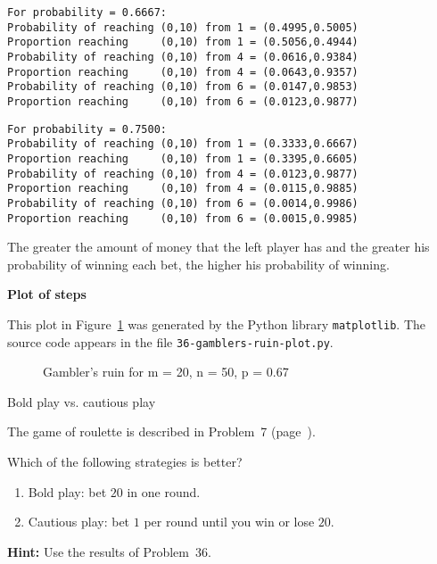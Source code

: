 \newpage

\sml{}
\begin{verbatim}
For probability = 0.6667:
Probability of reaching (0,10) from 1 = (0.4995,0.5005)
Proportion reaching     (0,10) from 1 = (0.5056,0.4944)
Probability of reaching (0,10) from 4 = (0.0616,0.9384)
Proportion reaching     (0,10) from 4 = (0.0643,0.9357)
Probability of reaching (0,10) from 6 = (0.0147,0.9853)
Proportion reaching     (0,10) from 6 = (0.0123,0.9877)
\end{verbatim}

\begin{verbatim}
For probability = 0.7500:
Probability of reaching (0,10) from 1 = (0.3333,0.6667)
Proportion reaching     (0,10) from 1 = (0.3395,0.6605)
Probability of reaching (0,10) from 4 = (0.0123,0.9877)
Proportion reaching     (0,10) from 4 = (0.0115,0.9885)
Probability of reaching (0,10) from 6 = (0.0014,0.9986)
Proportion reaching     (0,10) from 6 = (0.0015,0.9985)
\end{verbatim}
The greater the amount of money that the left player has and the greater his probability of winning each bet, the higher his probability of winning.

\textbf{Plot of steps}

This plot in Figure~\ref{f.plot} was generated by the Python library \texttt{matplotlib}. The source code appears in the file \texttt{36-gamblers-ruin-plot.py}.
\begin{figure}
\begin{center}

\end{center}
\caption{Gambler's ruin for m = 20, n = 50, p = 0.67}\label{f.plot}
\end{figure}


\newpage

\begin{prob}{Bold play vs. cautious play}

The game of roulette is described in Problem~7 (page~\pageref{p.roulette}).

Which of the following strategies is better?
\begin{enumerate}
\item Bold play: bet $20$ in one round.
\item Cautious play: bet $1$ per round until you win or lose $20$.
\end{enumerate}
\textbf{Hint:} Use the results of Problem~36.
\end{prob}

